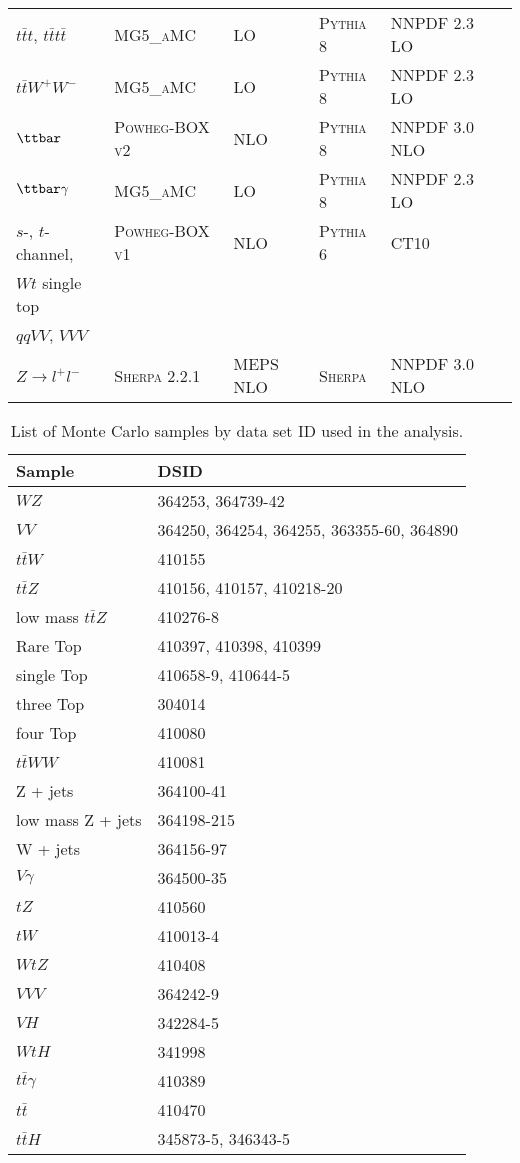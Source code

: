 \begin{table}[hbt!]
\begin{center}
{\begin{tabular}{llllll}
$t\bar t t$, $t\bar t t\bar t$ & \textsc{MG5\_aMC} & LO & \textsc{Pythia} 8 & NNPDF 2.3 LO  \\
$t\bar t W^+ W^-$ & \textsc{MG5\_aMC} & LO & \textsc{Pythia} 8 & NNPDF 2.3 LO\\
$\ttbar$ & \textsc{Powheg-BOX v2} \cite{powhegtt} & NLO & \textsc{Pythia} 8 & NNPDF 3.0 NLO  \\
$\ttbar\gamma$ & \textsc{MG5\_aMC} & LO & \textsc{Pythia} 8 & NNPDF 2.3 LO \\
$s$-, $t$-channel, & \textsc{Powheg-BOX v1} \cite{powhegstp}& NLO & \textsc{Pythia} 6 & CT10 \\
 $Wt$ single top & & & &  \\
$qqVV$, $VVV$ & &   \\
$Z \to l^+l^-$ & \textsc{Sherpa} 2.2.1 & MEPS NLO  & \textsc{Sherpa} & NNPDF 3.0 NLO \\
\hline\hline
\end{tabular}
}
\end{center}
\end{table}

\begin{table}[hbt!]
    \centering
    \begin{tabular}{l|l}
        \hline\hline
        Sample & DSID \\
        \hline\hline
        $WZ$ & 364253, 364739-42 \\
        $VV$ & 364250, 364254, 364255, 363355-60, 364890 \\
        $t\bar{t}W$ & 410155 \\
        $t\bar{t}Z$ & 410156, 410157, 410218-20 \\
        low mass $t\bar{t}Z$ & 410276-8 \\
        Rare Top & 410397, 410398, 410399 \\
        single Top & 410658-9, 410644-5 \\
        three Top & 304014 \\
        four Top & 410080 \\
        $t\bar{t}WW$ & 410081 \\
        Z + jets & 364100-41 \\
        low mass Z + jets & 364198-215 \\
        W + jets & 364156-97 \\
        $V\gamma$ & 364500-35 \\
        $tZ$  & 410560 \\
        $tW$  & 410013-4 \\
        $WtZ$ & 410408 \\
        $VVV$ & 364242-9 \\
        $VH$ & 342284-5 \\
        $WtH$ & 341998 \\
        $t\bar{t}\gamma$ & 410389 \\
        $t\bar{t}$ & 410470 \\
        $t\bar{t}H$ & 345873-5, 346343-5 \\
        \hline\hline
    \end{tabular}
    \caption{List of Monte Carlo samples by data set ID used in the analysis.}
    \label{tbl:dsids}
\end{table}
